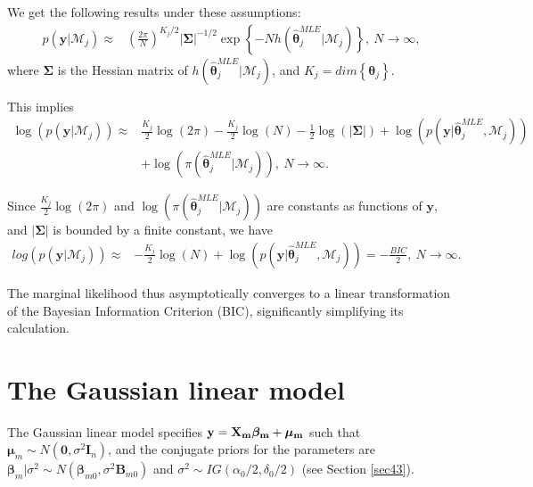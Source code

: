 We get the following results under these assumptions:
\begin{align*}
	p(\bm{y} | \mathcal{M}_j)\approx&\left( \frac{2\pi}{N}\right)^{K_j/2}|\bm{\Sigma}|^{-1/2} \exp\left\{-N h(\bm{\hat{\theta}}_j^{MLE}|\mathcal{M}_j)\right\}, \ N\rightarrow\infty,
\end{align*}
where $\bm{\Sigma}$ is the Hessian matrix of $h(\bm{\hat{\theta}}_j^{MLE}|\mathcal{M}_j)$, and $K_j=dim\left\{\bm{\theta}_j\right\}$.

This implies
\begin{align*}
	\log\left(p(\bm{y} | \mathcal{M}_j)\right)\approx& \frac{K_j}{2}\log(2\pi)- \frac{K_j}{2}\log(N) -\frac{1}{2}\log(|\bm{\Sigma}|) + \log(p(\bm{y}| \bm{\hat{\theta}}_j^{MLE},\mathcal{M}_j))\\
	&+\log(\pi(\bm{\hat{\theta}}_j^{MLE} | \mathcal{M}_j)), \ N\rightarrow\infty.
\end{align*}

Since $\frac{K_j}{2}\log(2\pi)$ and $\log(\pi(\bm{\hat{\theta}}_j^{MLE} | \mathcal{M}_j))$ are constants as functions of $\bm{y}$, and $|\bm{\Sigma}|$ is bounded by a finite constant, we have
\begin{align*}
	log\left(p(\bm{y} | \mathcal{M}_j)\right)\approx& -\frac{K_j}{2}\log(N)+\log(p(\bm{y}| \bm{\hat{\theta}}_j^{MLE},\mathcal{M}_j))= -\frac{BIC}{2}, \ N \rightarrow \infty.
\end{align*}

The marginal likelihood thus asymptotically converges to a linear transformation of the Bayesian Information Criterion (BIC), significantly simplifying its calculation.

\section{The Gaussian linear model}\label{sec10_2}

The Gaussian linear model specifies $\bf{y}=\bm{X}_m\bm{\beta}_m+\bm{\mu}_m$ such that $\bm{\mu}_m\sim{N}(\bm{0},\sigma^2\bm{I}_n)$, and the conjugate priors for the parameters are $\bm{\beta}_m|\sigma^2 \sim {N}(\bm{\beta}_{m0}, \sigma^2 \bm{B}_{m0})$ and $\sigma^2 \sim {I}{G}(\alpha_0/2, \delta_0/2)$ (see Section \ref{sec43}). 

